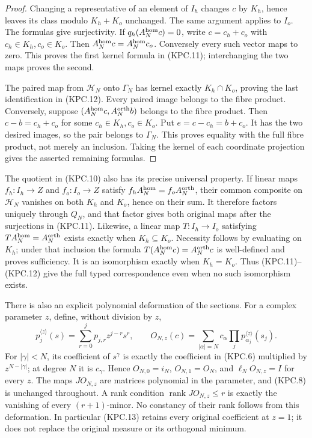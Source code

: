 \begin{proof}
Changing a representative of an element of \(I_h\) changes
\(c\) by \(K_h\), hence leaves its class modulo
\(K_h+K_o\) unchanged.  The same argument applies to
\(I_o\).  The formulas give surjectivity.  If \(q_h(A_N^{\rm hom}c)=0\),
write \(c=c_h+c_o\) with \(c_h\in K_h,c_o\in K_o\).
Then \(A_N^{\rm hom}c=A_N^{\rm hom}c_o\).  Conversely
every such vector maps to zero.  This proves the first kernel
formula in (KPC.11); interchanging the two maps proves the second.

The paired map from \(\mathcal H_N\) onto \(\Gamma_N\)
has kernel exactly \(K_h\cap K_o\), proving the last
identification in (KPC.12).  Every paired image belongs to the
fibre product.  Conversely, suppose
\((A_N^{\rm hom}c,A_N^{\rm orth}b)\) belongs to the fibre
product.  Then \(c-b=c_h+c_o\) for some
\(c_h\in K_h,c_o\in K_o\).  Put
\(e=c-c_h=b+c_o\).  It has the two desired images,
so the pair belongs to \(\Gamma_N\).  This proves equality
with the full fibre product, not merely an inclusion.  Taking
the kernel of each coordinate projection gives the asserted
remaining formulas.
\end{proof}

The quotient in (KPC.10) also has its precise universal property.
If linear maps \(f_h:I_h\to Z\) and \(f_o:I_o\to Z\)
satisfy \(f_hA_N^{\rm hom}=f_oA_N^{\rm orth}\), their
common composite on \(\mathcal H_N\) vanishes on both
\(K_h\) and \(K_o\), hence on their sum.  It therefore
factors uniquely through \(Q_N\), and that factor gives
both original maps after the surjections in (KPC.11).
Likewise, a linear map \(T:I_h\to I_o\) satisfying
\(TA_N^{\rm hom}=A_N^{\rm orth}\) exists exactly when
\(K_h\subseteq K_o\).  Necessity follows by evaluating
on \(K_h\); under that inclusion the formula
\(T(A_N^{\rm hom}c)=A_N^{\rm orth}c\) is well-defined
and proves sufficiency.  It is an isomorphism exactly when
\(K_h=K_o\).  Thus (KPC.11)--(KPC.12) give the full
typed correspondence even when no such isomorphism exists.

There is also an explicit polynomial deformation of the sections.
For a complex parameter \(z\), define, without division by \(z\),
\[
 p_j^{\langle z\rangle}(s)=\sum_{r=0}^j
                 p_{j,r}z^{j-r}s^r,\qquad
 O_{N,z}(c)=\sum_{|\alpha|=N}c_\alpha
                         \prod_jp_{\alpha_j}^{\langle z\rangle}(s_j).
 \tag{KPC.13}
\]
For \(|\gamma|<N\), its coefficient of \(s^\gamma\) is
exactly the coefficient in (KPC.6) multiplied by
\(z^{N-|\gamma|}\); at degree \(N\) it is \(c_\gamma\).
Hence \(O_{N,0}=i_N\), \(O_{N,1}=O_N\), and
\(\ell_NO_{N,z}=I\) for every \(z\).  The maps
\(JO_{N,z}\) are matrices polynomial in the parameter,
and (KPC.8) is unchanged throughout.  A rank condition
\(\operatorname{rank}JO_{N,z}\le r\) is exactly the
vanishing of every \((r+1)\)-minor.  No constancy of their
rank follows from this deformation.  In particular (KPC.13)
retains every original coefficient at \(z=1\); it does not
replace the original measure or its orthogonal minimum.

